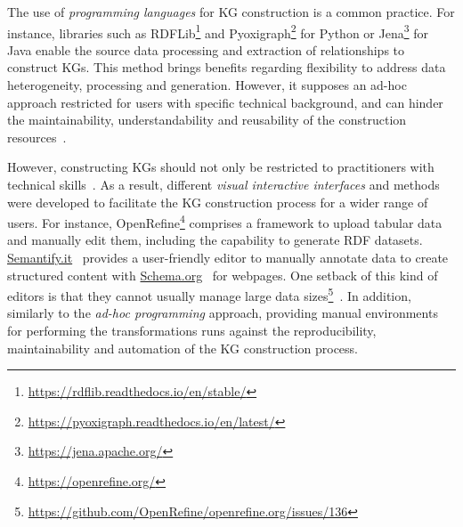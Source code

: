 The use of \textit{programming languages} for KG construction is a common practice. 
For instance, libraries such as RDFLib\footnote{\url{https://rdflib.readthedocs.io/en/stable/}} and Pyoxigraph\footnote{\url{https://pyoxigraph.readthedocs.io/en/latest/}} for Python or Jena\footnote{\url{https://jena.apache.org/}} for Java enable the source data processing and extraction of relationships to construct KGs. 
This method brings benefits regarding flexibility to address data heterogeneity, processing and generation. 
However, it supposes an ad-hoc approach restricted for users with specific technical background, and can hinder the maintainability, understandability and reusability of the construction resources~\parencite{iglesias2019bio2rdf}.

However, constructing KGs should not only be restricted to practitioners with technical skills~\parencite{karger2014semantic}. 
As a result, different \textit{visual interactive interfaces} and methods were developed to facilitate the KG construction process for a wider range of users.
For instance, OpenRefine\footnote{\url{https://openrefine.org/}} comprises a framework to upload tabular data and manually edit them, including the capability to generate RDF datasets. \url{Semantify.it}~\parencite{karle2017semantifyit} provides a user-friendly editor to manually annotate data to create structured content with \url{Schema.org}~\parencite{guha2016schema.org} for webpages. 
One setback of this kind of editors is that they cannot usually manage large data sizes\footnote{\url{https://github.com/OpenRefine/openrefine.org/issues/136}}~\parencite{petrova2020data}. 
In addition, similarly to the \textit{ad-hoc programming} approach, providing manual environments for performing the transformations runs against the reproducibility, maintainability and automation of the KG construction process. 


